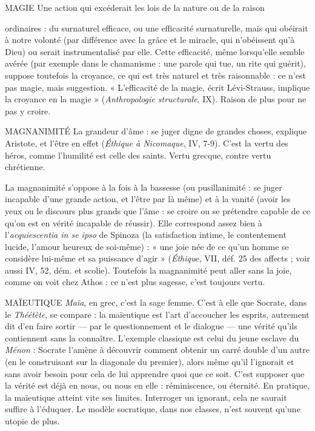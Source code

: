 MAGIE Une action qui excéderait les lois de la nature ou de la raison

ordinaires : du surnaturel efficace, ou une efficacité surnaturelle,
mais qui obéirait à notre volonté (par différence avec la grâce et le miracle, qui
n’obéissent qu’à Dieu) ou serait instrumentalisé par elle. Cette efficacité, même
lorsqu’elle semble avérée (par exemple dans le chamanisme : une parole qui tue,
un rite qui guérit), suppose toutefois la croyance, ce qui est très naturel et très
raisonnable : ce n’est pas magie, mais suggestion. « L'efficacité de la magie,
écrit Lévi-Strauss, implique la croyance en la magie » ({\it Anthropologie structurale},
IX). Raison de plus pour ne pas y croire.

MAGNANIMITÉ La grandeur d'âme : se juger digne de grandes choses,
explique Aristote, et l’être en effet ({\it Éthique à Nicomaque},
IV, 7-9). C’est la vertu des héros, comme l’humilité est celle des saints. Vertu
grecque, contre vertu chrétienne.

La magnanimité s’oppose à la fois à la bassesse (ou pusillanimité : se juger
incapable d’une grande action, et l’être par là même) et à la vanité (avoir les
yeux ou le discours plus grands que l’âme : se croire ou se prétendre capable de
ce qu'on est en vérité incapable de réussir). Elle correspond assez bien à
l’{\it acquiescentia in se ipso} de Spinoza (la satisfaction intime, le contentement
lucide, l'amour heureux de soi-même) : « une joie née de ce qu’un homme se
considère lui-même et sa puissance d’agir » ({\it Éthiqu}e, VII, déf. 25 des affects ;
voir aussi IV, 52, dém. et scolie). Toutefois la magnanimité peut aller sans la
joie, comme on voit chez Athos : ce n’est plus sagesse, c’est toujours vertu.

MAÏEUTIQUE {\it Maîa}, en grec, c’est la sage femme. C’est à elle que Socrate,
dans le {\it Théétète}, se compare : la maïeutique est l’art
d’accoucher les esprits, autrement dit d’en faire sortir — par le questionnement
et le dialogue — une vérité qu’ils contiennent sans la connaître. L'exemple classique
est celui du jeune esclave du {\it Ménon} : Socrate l’amène à découvrir comment
obtenir un carré double d’un autre (en le construisant sur la diagonale du
premier), alors même qu’il l’ignorait et sans avoir besoin pour cela de lui
apprendre quoi que ce soit. C’est supposer que la vérité est déjà en nous, ou
nous en elle : réminiscence, ou éternité.
En pratique, la maïeutique atteint vite ses limites. Interroger un ignorant,
cela ne saurait suffire à l’éduquer. Le modèle socratique, dans nos classes, n’est
souvent qu’une utopie de plus.

